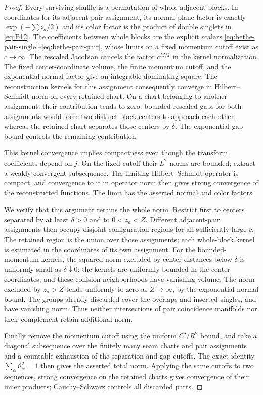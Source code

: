 \begin{proof}
Every surviving shuffle is a permutation of whole adjacent
blocks.  In coordinates for its adjacent-pair assignment, its
normal plane factor is
exactly \(\exp(-\sum z_a/2)\) and its color factor is the product
of double singlets in \eqref{eq:B12}.  The coefficients between
whole blocks are the explicit scalars
\eqref{eq:bethe-pair-single}--\eqref{eq:bethe-pair-pair}, whose
limits on a fixed momentum cutoff exist as \(c\to\infty\).
The rescaled Jacobian cancels the factor \(c^{M/2}\) in the
kernel normalization.  The fixed center-coordinate volume,
the finite momentum cutoff, and the exponential normal factor
give an integrable dominating square.
The reconstruction kernels for this assignment consequently
converge in Hilbert--Schmidt norm on every retained chart.
On a chart belonging to another assignment, their contribution
tends to zero: bounded rescaled gaps for both assignments would
force two distinct block centers to approach each other, whereas
the retained chart separates those centers by \(\delta\).
The exponential gap bound controls the remaining contribution.

This kernel convergence implies compactness even though the
transform coefficients depend on \(j\).  On the fixed cutoff
their \(L^2\) norms are bounded; extract a weakly convergent
subsequence.  The limiting Hilbert--Schmidt operator is compact,
and convergence to it in operator norm then gives strong
convergence of the reconstructed functions.
The limit has the asserted normal and color factors.

We verify that this argument retains the whole norm.
Restrict first to centers separated by at least \(\delta>0\)
and to \(0<z_a<Z\).  Different adjacent-pair assignments then
occupy disjoint configuration regions for all sufficiently
large \(c\).  The retained region is the union over those
assignments; each whole-block kernel is estimated in the
coordinates of its own assignment.
For the bounded-momentum kernels, the squared
norm excluded by center distances below \(\delta\) is uniformly
small as \(\delta\downarrow0\): the kernels are uniformly
bounded in the center coordinates, and these collision
neighborhoods have vanishing volume.
The norm excluded by \(z_a>Z\) tends uniformly to zero as
\(Z\to\infty\), by the exponential normal bound.
The groups already discarded cover the overlaps and inserted
singles, and have vanishing norm.
Thus neither intersections of pair coincidence manifolds nor
their complement retain additional norm.

Finally remove the momentum cutoff using the uniform
\(C'/R^2\) bound, and take a diagonal subsequence over the
finitely many seam charts and pair assignments and a countable
exhaustion of the separation and gap cutoffs.
The exact identity \(\sum_\alpha\vartheta_\alpha^2=1\)
then gives the asserted total norm.
Applying the same cutoffs to two sequences, strong convergence
on the retained charts gives convergence of their inner
products; Cauchy--Schwarz controls all discarded parts.
\end{proof}


